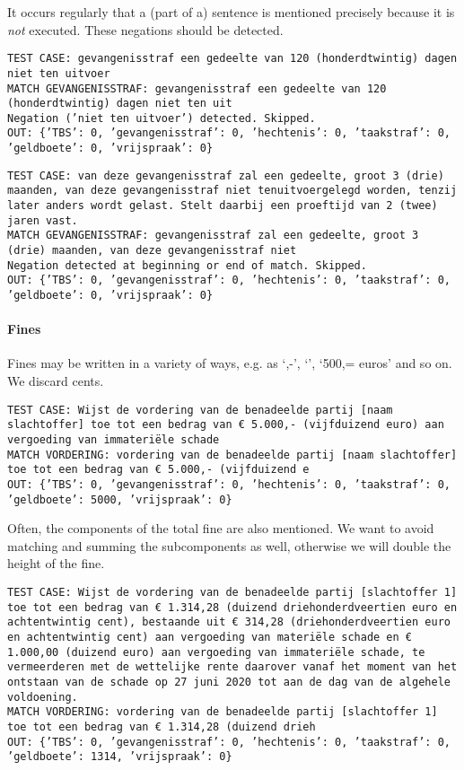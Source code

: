 \documentclass[a4paper]{article}
\begin{document}
It occurs regularly that a (part of a) sentence is mentioned precisely because it is \emph{not} executed.
These negations should be detected.

\texttt{TEST CASE: %
gevangenisstraf een gedeelte van 120 (honderdtwintig) dagen niet ten uitvoer\\
MATCH GEVANGENISSTRAF: gevangenisstraf een gedeelte van 120 (honderdtwintig) dagen niet ten uit\\
Negation ('niet ten uitvoer') detected. Skipped.\\
OUT: \{'TBS': 0, 'gevangenisstraf': 0, 'hechtenis': 0, 'taakstraf': 0, 'geldboete': 0, 'vrijspraak': 0\}}

\texttt{TEST CASE: %
van deze gevangenisstraf zal een gedeelte, groot 3 (drie) maanden, van deze gevangenisstraf niet tenuitvoergelegd worden, tenzij later anders wordt gelast. Stelt daarbij een proeftijd van 2 (twee) jaren vast.\\
MATCH GEVANGENISSTRAF: gevangenisstraf zal een gedeelte, groot 3 (drie) maanden, van deze gevangenisstraf niet\\
Negation detected at beginning or end of match. Skipped.\\
OUT: \{'TBS': 0, 'gevangenisstraf': 0, 'hechtenis': 0, 'taakstraf': 0, 'geldboete': 0, 'vrijspraak': 0\}}

\paragraph{Fines}

Fines may be written in a variety of ways, e.g. as `,-', `', `500,= euros' and so on.
We discard cents.

\texttt{TEST CASE: %
Wijst de vordering van de benadeelde partij [naam slachtoffer] toe tot een bedrag van € 5.000,- (vijfduizend euro) aan vergoeding van immateriële schade\\
MATCH VORDERING: vordering van de benadeelde partij [naam slachtoffer] toe tot een bedrag van € 5.000,- (vijfduizend e\\
OUT: \{'TBS': 0, 'gevangenisstraf': 0, 'hechtenis': 0, 'taakstraf': 0, 'geldboete': 5000, 'vrijspraak': 0\}}

Often, the components of the total fine are also mentioned. We want to avoid matching and summing the subcomponents as well, otherwise we will double the height of the fine.

\texttt{TEST CASE: %
Wijst de vordering van de benadeelde partij [slachtoffer 1] toe tot een bedrag van  € 1.314,28 (duizend driehonderdveertien euro en achtentwintig cent), bestaande uit € 314,28 (driehonderdveertien euro en achtentwintig cent) aan vergoeding van materiële schade en € 1.000,00 (duizend euro) aan vergoeding van immateriële schade, te vermeerderen met de wettelijke rente daarover vanaf het moment van het ontstaan van de schade op 27 juni 2020 tot aan de dag van de algehele voldoening.\\
MATCH VORDERING: vordering van de benadeelde partij [slachtoffer 1] toe tot een bedrag van  € 1.314,28 (duizend drieh\\
OUT: \{'TBS': 0, 'gevangenisstraf': 0, 'hechtenis': 0, 'taakstraf': 0, 'geldboete': 1314, 'vrijspraak': 0\}}
\end{document}
